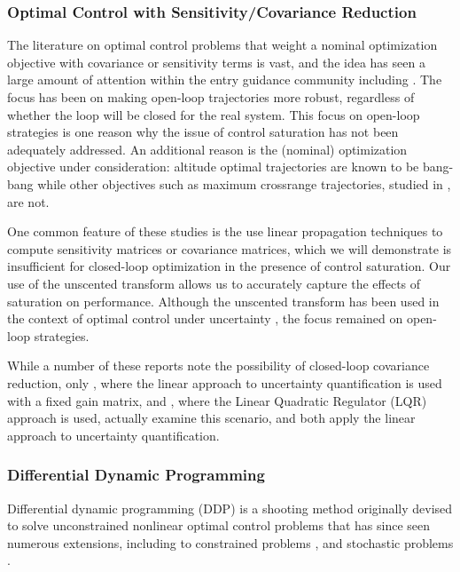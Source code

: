 \documentclass[journal ]{new-aiaa}
\begin{document}
\subsubsection*{Optimal Control with Sensitivity/Covariance Reduction}
The literature on optimal control problems that weight a nominal optimization objective with covariance or sensitivity terms is vast, and the idea has seen a large amount of attention within the entry guidance community including \cite{AltitudeUnderUncertainty, MarsEntryDesensitized, EntryOUUThesis1, EntryOUUThesis2, EntryOUU}.
The focus has been on making open-loop trajectories more robust, regardless of whether the loop will be closed for the real system. This focus on open-loop strategies is one reason why the issue of control saturation has not been adequately addressed. An additional reason is the (nominal) optimization objective under consideration: altitude optimal trajectories are known to be bang-bang \cite{AltitudeOptimization} while other objectives such as maximum crossrange trajectories, studied in \cite{EntryOUUThesis2}, are not.  

One common feature of these studies is the use linear propagation techniques to compute sensitivity matrices or covariance matrices, which we will demonstrate is insufficient for closed-loop optimization in the presence of control saturation. Our use of the unscented transform allows us to accurately capture the effects of saturation on performance. Although the unscented transform has been used in the context of optimal control under uncertainty \cite{UnscentedOptimalControl}, the focus remained on open-loop strategies. 

While a number of these reports note the possibility of closed-loop covariance reduction, only \cite{MarsEntryDesensitized}, where the linear approach to uncertainty quantification is used with a fixed gain matrix, and \cite{EntryOUUThesis2}, where the Linear Quadratic Regulator (LQR) approach is used, actually examine this scenario, and both apply the linear approach to uncertainty quantification.

\subsubsection*{Differential Dynamic Programming}
Differential dynamic programming (DDP) \cite{DDP} is a shooting method originally devised to solve unconstrained nonlinear optimal control problems that has since seen numerous extensions, including to constrained problems \cite{DDP_ControlLimited,HDDP1,HDDP2,DDP_NonlinearConstraints,DDP_InteriorPoint}, and stochastic problems \cite{iLQG, DDP_Stochastic, ozaki_UT,ozaki2020tube}. 
\end{document}
